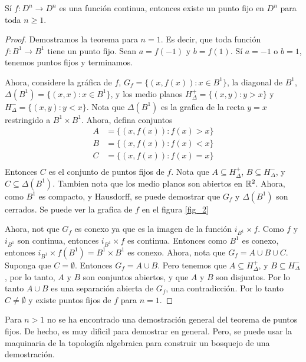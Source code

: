 \begin{theorem}\label{thm_1}
    S\'i $f:D^n \rightarrow D^n$ es una funci\'on continua, entonces existe un
    punto fijo en $D^n$ para toda $n \geq 1$.
\end{theorem}
\begin{proof}
    Demostramos la teorema para $n=1$. Es decir, que toda funci\'on  $f:B^1
    \rightarrow B^1$ tiene un punto fijo. Sean $a=f(-1)$ y $b=f(1)$. S\'i $a=-1$ o
    $b=1$, tenemos puntos fijos y terminamos.

    Ahora, considere la gr\'afica de $f$,  $G_f=\{(x,f(x)) : x \in B^1\}$, la
    diagonal de $B^1$, $\Delta(B^1)=\{(x,x) : x \in B^1\}$, y los medio planos
    $H^+_\Delta=\{(x,y) : y>x\}$ y $H^-_\Delta=\{(x,y) : y<x\}$. Nota que
    $\Delta(B^1)$ es la grafica de la recta $y=x$ restringido a $B^1 \times B^1$.
    Ahora, defina conjuntos
    \begin{align*}
        A   &=      \{(x,f(x)) : f(x)>x\} \\
        B   &=      \{(x,f(x)) : f(x)<x\} \\
        C   &=      \{(x,f(x)) : f(x)=x\} \\
    \end{align*}
    Entonces $C$ es el conjunto de puntos fijos de $f$. Nota que $A \subseteq
    H^+_\Delta$,  $B \subseteq H^-_\Delta$, y $C \subseteq \Delta(B^1)$. Tambien
    nota que los medio planos son abiertos en
    $\mathbb{R}^2$. Ahora, como  $B^1$ es compacto, y Hausdorff, se puede demostrar que
    $G_f$ y  $\Delta(B^1)$ son cerrados. Se puede ver la grafica de $f$ en el
    figura \ref{fig_2}

    Ahora, not que $G_f$ es conexo ya que es la imagen de la funci\'on $i_{B^1}
    \times f$. Como  $f$ y  $i_{B^1}$ son continua, entonces  $i_{B^1} \times f$
    es continua. Entonces como  $B^1$ es conexo, entonces $i_{B^1} \times
    f(B^1)=B^1 \times B^1$ es conexo. Ahora, nota que $G_f=A \cup B \cup C$.
    Suponga que $C=\emptyset$. Entonces  $G_f=A \cup B$. Pero tenemos que $A
    \subseteq H^+_\Delta$, y $B \subseteq H^-_\Delta$, por lo tanto, $A$ y  $B$
    son conjuntos abiertos, y que  $A$  y $B$ son disjuntos. Por lo tanto $A \cup
    B$ es una separaci\'on abierta de  $G_f$, una contradicci\'on. Por lo tanto
    $C \neq \emptyset$ y existe puntos fijos de  $f$ para $n=1$.
\end{proof}
\begin{remark}
    Para $n > 1$ no se ha encontrado una demostraci\'on general del teorema de
    puntos fijos. De hecho, es muy dificil para demostrar en general. Pero, se
    puede usar la maquinaria de la topologi\'ia algebraica para construir un
    bosquejo de una demostraci\'on.
\end{remark}

